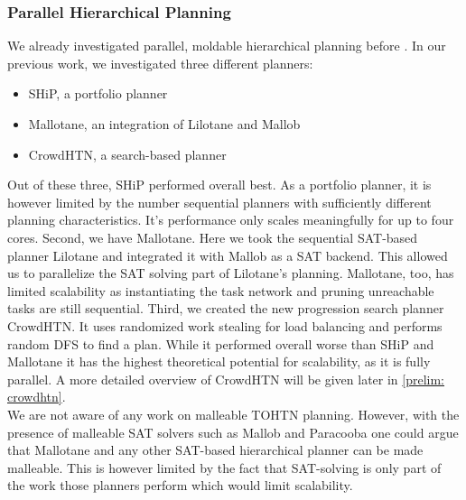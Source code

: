 \subsubsection{Parallel Hierarchical Planning}
We already investigated parallel, moldable hierarchical planning before \cite{bretl2021parallel}. In our previous work, we investigated three different planners:
\begin{itemize}
	\item SHiP, a portfolio planner
	\item Mallotane, an integration of Lilotane and Mallob
	\item CrowdHTN, a search-based planner
\end{itemize}
Out of these three, SHiP performed overall best. As a portfolio planner, it is however limited by the number sequential planners with sufficiently different planning characteristics. It's performance only scales meaningfully for up to four cores. Second, we have Mallotane. Here we took the sequential SAT-based planner Lilotane and integrated it with Mallob as a SAT backend. This allowed us to parallelize the SAT solving part of Lilotane's planning. Mallotane, too, has limited scalability as instantiating the task network and pruning unreachable tasks are still sequential. Third, we created the new progression search planner CrowdHTN. It uses randomized work stealing for load balancing and performs random DFS to find a plan. While it performed overall worse than SHiP and Mallotane it has the highest theoretical potential for scalability, as it is fully parallel. A more detailed overview of CrowdHTN will be given later in \ref{prelim: crowdhtn}.\\
We are not aware of any work on malleable TOHTN planning. However, with the presence of malleable SAT solvers such as Mallob \cite{sanders2022decentralized} and Paracooba \cite{heisinger2020distributed} one could argue that Mallotane and any other SAT-based hierarchical planner can be made malleable. This is however limited by the fact that SAT-solving is only part of the work those planners perform which would limit scalability.